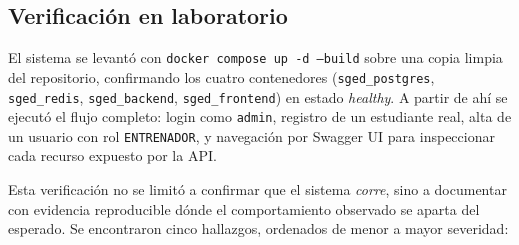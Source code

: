 \documentclass[12pt,a4paper]{article}
\begin{document}
\subsection{Verificación en laboratorio}

El sistema se levantó con \texttt{docker compose up -d --build} sobre una copia limpia del
repositorio, confirmando los cuatro contenedores (\texttt{sged\_postgres},
\texttt{sged\_redis}, \texttt{sged\_backend}, \texttt{sged\_frontend}) en estado
\textit{healthy}. A partir de ahí se ejecutó el flujo completo: login como \texttt{admin},
registro de un estudiante real, alta de un usuario con rol \texttt{ENTRENADOR}, y navegación
por Swagger UI para inspeccionar cada recurso expuesto por la API.

Esta verificación no se limitó a confirmar que el sistema \textit{corre}, sino a documentar
con evidencia reproducible dónde el comportamiento observado se aparta del esperado. Se
encontraron cinco hallazgos, ordenados de menor a mayor severidad:
\end{document}
